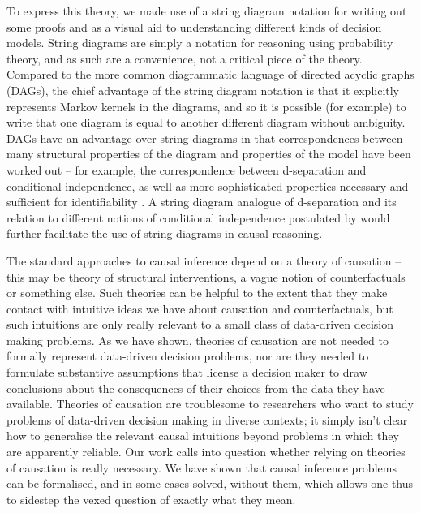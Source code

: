 To express this theory, we made use of a string diagram notation for writing out some proofs and as a visual aid to understanding different kinds of decision models. String diagrams are simply a notation for reasoning using probability theory, and as such are a convenience, not a critical piece of the theory. Compared to the more common diagrammatic language of directed acyclic graphs (DAGs), the chief advantage of the string diagram notation is that it explicitly represents Markov kernels in the diagrams, and so it is possible (for example) to write that one diagram is equal to another different diagram without ambiguity. DAGs have an advantage over string diagrams in that correspondences between many structural properties of the diagram and properties of the model have been worked out -- for example, the correspondence between d-separation and conditional independence, as well as more sophisticated properties necessary and sufficient for identifiability \citep{tian2002general,shpitser_complete_2008}. A string diagram analogue of d-separation and its relation to different notions of conditional independence postulated by \citet{fritz_synthetic_2020} would further facilitate the use of string diagrams in causal reasoning.

The standard approaches to causal inference depend on a theory of causation -- this may be theory of structural interventions, a vague notion of counterfactuals or something else. Such theories can be helpful to the extent that they make contact with intuitive ideas we have about causation and counterfactuals, but such intuitions are only really relevant to a small class of data-driven decision making problems. As we have shown, theories of causation are not needed to formally represent data-driven decision problems, nor are they needed to formulate substantive assumptions that license a decision maker to draw conclusions about the consequences of their choices from the data they have available. Theories of causation are troublesome to researchers who want to study problems of data-driven decision making in diverse contexts; it simply isn't clear how to generalise the relevant causal intuitions beyond problems in which they are apparently reliable. Our work calls into question whether relying on theories of causation is really necessary. We have shown that causal inference problems can be formalised, and in some cases solved,  without them, which allows one thus to sidestep the vexed question of exactly what they mean.